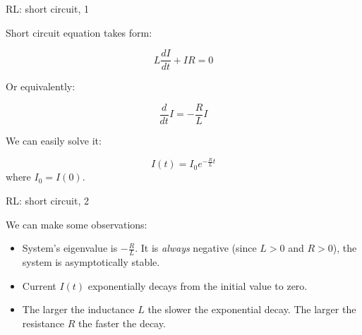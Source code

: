 \documentclass{beamer}
\begin{document}
\begin{frame}{RL: short circuit, 1}
	\begin{flushleft}
		
			Short circuit equation takes form:
		
			\begin{equation}
				L \frac{dI}{dt} + IR = 0
			\end{equation}
		
			Or equivalently:
			
			\begin{equation}
				\frac{d}{dt} I =  -\frac{R}{L} I
			\end{equation}
			
			We can easily solve it:
			
			\begin{equation}
				I(t) = I_0 e^{ -\frac{R}{L} t  }
			\end{equation}
		where $I_0 = I(0)$.
			
		
	\end{flushleft}
\end{frame}



\begin{frame}{RL: short circuit, 2}
	\begin{flushleft}
		
		We can make some observations:
		
		\bigskip
		
		\begin{itemize}
			\item System's eigenvalue is $ -\frac{R}{L}$. It is \emph{always} negative (since $L>0$ and $R>0$), the system is asymptotically stable.
			
			\item Current $I(t)$ exponentially decays from the initial value to zero.
			
			\item The larger the inductance $L$ the slower the exponential decay. The larger the resistance $R$ the faster the decay.
			
		\end{itemize}
		
		
	\end{flushleft}
\end{frame}
\end{document}
